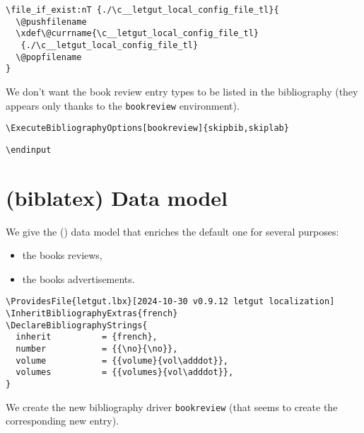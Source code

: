 \documentclass{letgut}
\begin{document}
\begin{lstlisting}
\file_if_exist:nT {./\c__letgut_local_config_file_tl}{
  \@pushfilename
  \xdef\@currname{\c__letgut_local_config_file_tl}
   {./\c__letgut_local_config_file_tl}
  \@popfilename
}
\end{lstlisting}

We don't want the book review entry types to be listed in the bibliography
(they appears only thanks to the \lstinline+bookreview+ environment).

\begin{lstlisting}
\ExecuteBibliographyOptions[bookreview]{skipbib,skiplab}
\end{lstlisting}

\begin{lstlisting}
\endinput
\end{lstlisting}

\section{(biblatex) Data model}
\label{biblatexDatamodel-vx7h55h0jlj0}
We give the () data model that enriches the default one for
several purposes:
\begin{itemize}
\item the books reviews,
\item the books advertisements.
\end{itemize}

\begin{lstlisting}
\ProvidesFile{letgut.lbx}[2024-10-30 v0.9.12 letgut localization]
\InheritBibliographyExtras{french}
\DeclareBibliographyStrings{
  inherit          = {french},
  number           = {{\no}{\no}},
  volume           = {{volume}{vol\adddot}},
  volumes          = {{volumes}{vol\adddot}},
}
\end{lstlisting}

We create the new bibliography driver \lstinline+bookreview+ (that seems to
create the corresponding new entry).
\end{document}
